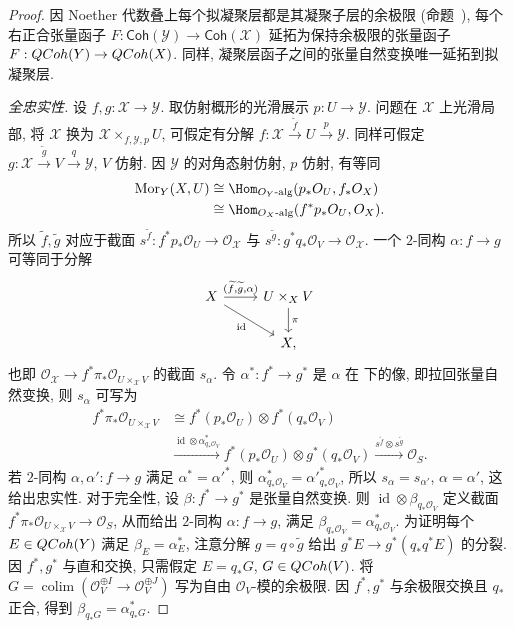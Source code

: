\begin{proof}
因 Noether 代数叠上每个拟凝聚层都是其凝聚子层的余极限 (命题~), 每个右正合张量函子 $F:\mathsf{Coh}(\mathcal Y)\to\mathsf{Coh}(\mathcal X)$ 延拓为保持余极限的张量函子 $F:QCoh(Y)\to QCoh(X)$. 同样, 凝聚层函子之间的张量自然变换唯一延拓到拟凝聚层.

\emph{全忠实性.} 设 $f,g:\mathcal X\to\mathcal Y$. 取仿射概形的光滑展示 $p:U\to\mathcal Y$. 问题在 $\mathcal X$ 上光滑局部, 将 $\mathcal X$ 换为 $\mathcal X\times_{f,\mathcal Y,p}U$, 可假定有分解 $f:\mathcal X\xrightarrow{\widetilde f}U\xrightarrow p\mathcal Y$. 同样可假定 $g:\mathcal X\xrightarrow{\widetilde g}V\xrightarrow q\mathcal Y$, $V$ 仿射. 因 $\mathcal Y$ 的对角态射仿射, $p$ 仿射, 有等同
\begin{align*}
\operatorname{Mor}_{\mathcal Y}(\mathcal X,U)&\cong\Hom_{\mathcal O_{\mathcal Y}\text{-alg}}(p_*\mathcal O_U,f_*\mathcal O_{\mathcal X})\\
&\cong\Hom_{\mathcal O_{\mathcal X}\text{-alg}}(f^*p_*\mathcal O_U,\mathcal O_{\mathcal X}).
\end{align*}
所以 $\widetilde f,\widetilde g$ 对应于截面 $s^{\widetilde f}:f^*p_*\mathcal O_U\to\mathcal O_{\mathcal X}$ 与 $s^{\widetilde g}:g^*q_*\mathcal O_V\to\mathcal O_{\mathcal X}$. 一个 $2$-同构 $\alpha:f\to g$ 可等同于分解
\begin{align*}
\begin{tikzcd}[ampersand replacement=\&]
\mathcal X\arrow[r,"{(\widetilde f,\widetilde g,\alpha)}"]\arrow[dr,"{\operatorname{id}}"']\&U\times_{\mathcal X}V\arrow[d,"{\pi}"]\\
\&\mathcal X,
\end{tikzcd}
\end{align*}
也即 $\mathcal O_{\mathcal X}\to f^*\pi_*\mathcal O_{U\times_{\mathcal X}V}$ 的截面 $s_\alpha$. 令 $\alpha^*:f^*\to g^*$ 是 $\alpha$ 在  下的像, 即拉回张量自然变换, 则 $s_\alpha$ 可写为
\begin{align*}
f^*\pi_*\mathcal O_{U\times_{\mathcal X}V}&\cong f^*(p_*\mathcal O_U)\otimes f^*(q_*\mathcal O_V)\\
&\xrightarrow{\operatorname{id}\otimes\alpha^*_{q_*\mathcal O_V}}f^*(p_*\mathcal O_U)\otimes g^*(q_*\mathcal O_V)\xrightarrow{s^{\widetilde f}\otimes s^{\widetilde g}}\mathcal O_S.
\end{align*}
若 $2$-同构 $\alpha,\alpha':f\to g$ 满足 $\alpha^*=\alpha'^*$, 则 $\alpha^*_{q_*\mathcal O_V}=\alpha'^*_{q_*\mathcal O_V}$, 所以 $s_\alpha=s_{\alpha'}$, $\alpha=\alpha'$, 这给出忠实性. 对于完全性, 设 $\beta:f^*\to g^*$ 是张量自然变换. 则 $\operatorname{id}\otimes\beta_{q_*\mathcal O_V}$ 定义截面 $f^*\pi_*\mathcal O_{U\times_{\mathcal X}V}\to\mathcal O_S$, 从而给出 $2$-同构 $\alpha:f\to g$, 满足 $\beta_{q_*\mathcal O_V}=\alpha^*_{q_*\mathcal O_V}$. 为证明每个 $E\in QCoh(Y)$ 满足 $\beta_E=\alpha_E^*$, 注意分解 $g=q\circ\widetilde g$ 给出 $g^*E\to g^*(q_*q^*E)$ 的分裂. 因 $f^*,g^*$ 与直和交换, 只需假定 $E=q_*G$, $G\in QCoh(V)$. 将 $G=\operatorname{colim}(\mathcal O_V^{\oplus I}\to\mathcal O_V^{\oplus J})$ 写为自由 $\mathcal O_V$-模的余极限. 因 $f^*,g^*$ 与余极限交换且 $q_*$ 正合, 得到 $\beta_{q_*G}=\alpha^*_{q_*G}$.


\end{proof}
